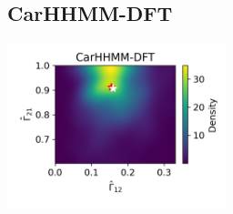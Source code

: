 \documentclass{article}
\begin{document}
        \subsection{CarHHMM-DFT}
        \begin{center}
        \includegraphics[width=2.5in]{../Plots/hhmm_FV_Gamma_density_-1_row_-1.png}
        

\end{center}
\end{document}
